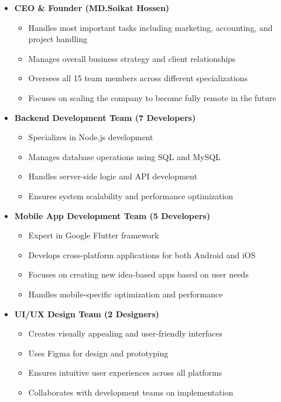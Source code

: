 \documentclass[12pt,a4paper]{article}
\begin{document}
\begin{itemize}
    \item \textbf{CEO \& Founder (MD.Soikat Hossen)}
    \begin{itemize}
        \item Handles most important tasks including marketing, accounting, and project handling
        \item Manages overall business strategy and client relationships
        \item Oversees all 15 team members across different specializations
        \item Focuses on scaling the company to become fully remote in the future
    \end{itemize}
    
    \item \textbf{Backend Development Team (7 Developers)}
    \begin{itemize}
        \item Specializes in Node.js development
        \item Manages database operations using SQL and MySQL
        \item Handles server-side logic and API development
        \item Ensures system scalability and performance optimization
    \end{itemize}
    
    \item \textbf{Mobile App Development Team (5 Developers)}
    \begin{itemize}
        \item Expert in Google Flutter framework
        \item Develops cross-platform applications for both Android and iOS
        \item Focuses on creating new idea-based apps based on user needs
        \item Handles mobile-specific optimization and performance
    \end{itemize}
    
    \item \textbf{UI/UX Design Team (2 Designers)}
    \begin{itemize}
        \item Creates visually appealing and user-friendly interfaces
        \item Uses Figma for design and prototyping
        \item Ensures intuitive user experiences across all platforms
        \item Collaborates with development teams on implementation
    \end{itemize}
    

\end{itemize}
\end{document}
